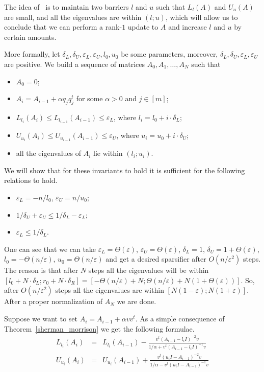 \documentclass[12pt]{article}
\newcommand{\eps}{\varepsilon}
\begin{document}
    The idea of~\cite{BSS09} is to maintain two barriers
    $l$ and $u$ such that $L_l(A)$ and $U_u(A)$ are small, and all the eigenvalues are
    within $(l; u)$, which will allow us
    to conclude that we can perform a rank-$1$ update to $A$ and increase $l$ and $u$ by certain amounts.

    More formally, let $\delta_L, \delta_U, \eps_L, \eps_U, l_0, u_0$ be some parameters, moreover,
    $\delta_L, \delta_U, \eps_L, \eps_U$ are positive.
    We build a sequence of matrices $A_0, A_1, \ldots, A_N$ such that
    \begin{itemize}
        \item $A_0 = 0$;
        \item $A_i = A_{i-1} + \alpha q_j q_j^t$ for some $\alpha > 0$ and $j \in [m]$;
        \item $L_{l_i}(A_i) \leq L_{l_{i-1}}(A_{i-1}) \leq \eps_L$, where $l_i = l_0 + i \cdot \delta_L$;
        \item $U_{u_i}(A_i) \leq U_{u_{i-1}}(A_{i-1}) \leq \eps_U$, where $u_i = u_0 + i \cdot \delta_U$;
        \item all the eigenvalues of $A_i$ lie within $(l_i; u_i)$.
    \end{itemize}
    We will show that for these invariants to hold it is sufficient for the following relations to hold.
    \begin{itemize}
        \item $\eps_L = -n / l_0$, $\eps_U = n / u_0$;
        \item $1 / \delta_U + \eps_U \leq 1 / \delta_L - \eps_L$;
        \item $\eps_L \leq 1 / \delta_L$.
    \end{itemize}
    One can see that we can take $\eps_L = \Theta(\eps)$, $\eps_U = \Theta(\eps)$, $\delta_L = 1$,
    $\delta_U = 1 + \Theta(\eps)$, $l_0 = -\Theta(n / \eps)$, $u_0 = \Theta(n / \eps)$ and get a desired sparsifier
    after $O(n / \eps^2)$ steps. The reason is that after $N$ steps all the eigenvalues
    will be within $[l_0 + N \cdot \delta_L; r_0 + N \cdot \delta_R] =
    [-\Theta(n / \eps) + N; \Theta(n / \eps) + N (1 + \Theta(\eps))]$. So, after
    $O(n / \eps^2)$ steps all the eigenvalues are within $[N(1 - \eps); N(1 + \eps)]$.
    After a proper normalization of $A_N$ we are done.

    Suppose we want to set $A_i = A_{i-1} + \alpha vv^t$. As a simple consequence of Theorem~\ref{sherman_morrison} we
    get the following formulae.
    \begin{eqnarray*}
        L_{l_i}(A_i) &=& L_{l_i}(A_{i-1}) - \frac{v^t (A_{i-1} - l_iI)^{-2} v}{1 / \alpha + v^t (A_{i-1} - l_i I)^{-1} v}\\
        U_{u_i}(A_i) &=& U_{u_i}(A_{i-1}) + \frac{v^t (u_iI - A_{i-1})^{-2} v}{1 / \alpha - v^t (u_iI - A_{i-1})^{-1} v}\\
    \end{eqnarray*}
\end{document}
